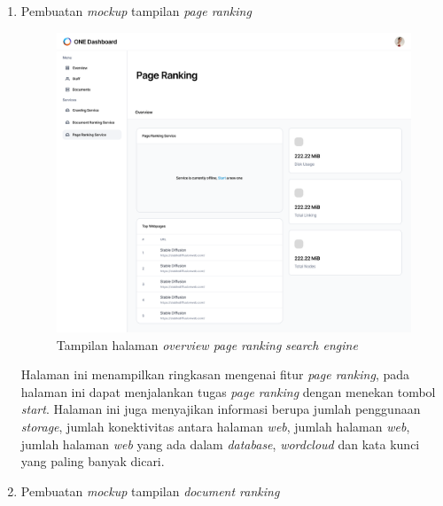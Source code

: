 \begin{enumerate}[label=\alph*)., leftmargin=1\parindent]
	
	\item{Pembuatan \textit{mockup} tampilan \textit{page ranking}}
	
	
	\begin{figure}[H]
		\centering
		\includegraphics[keepaspectratio, width=13cm]{gambar/uiux_pageranking_overview.png}
		\caption{Tampilan halaman \textit{overview page ranking} \textit{search engine}}
		\label{gambar:uiux_pageranking_overview.png}
	\end{figure}


	Halaman ini menampilkan ringkasan mengenai fitur \textit{page ranking}, pada halaman ini dapat menjalankan tugas \textit{page ranking} dengan menekan tombol \textit{start}. Halaman ini juga menyajikan informasi berupa jumlah penggunaan \textit{storage}, jumlah konektivitas antara halaman \textit{web}, jumlah halaman \textit{web}, jumlah halaman \textit{web} yang ada dalam \textit{database}, \textit{wordcloud} dan kata kunci yang paling banyak dicari.
	
	\item{Pembuatan \textit{mockup} tampilan \textit{document ranking}}
	

\end{enumerate}
